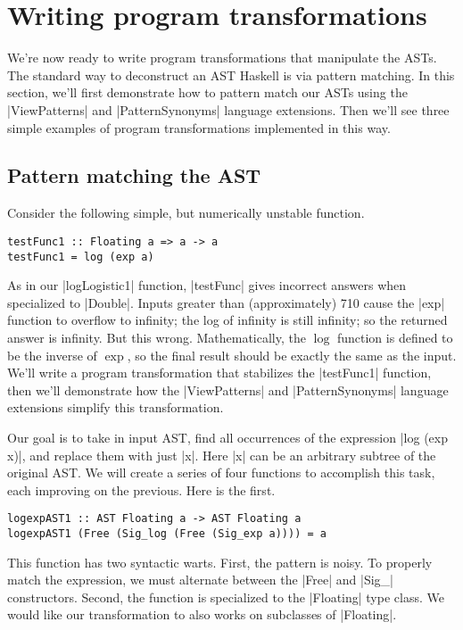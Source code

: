 \documentclass[preprint]{sigplanconf}
\theoremstyle{definition}
\begin{document}

\section{Writing program transformations}
\label{sec:stabilize}

We're now ready to write program transformations that manipulate the ASTs.
The standard way to deconstruct an AST Haskell is via pattern matching.
In this section, we'll first demonstrate how to pattern match our ASTs using the |ViewPatterns| and |PatternSynonyms| language extensions.
Then we'll see three simple examples of program transformations implemented in this way.


\subsection{Pattern matching the AST}

Consider the following simple,
but numerically unstable function.
\begin{lstlisting}
testFunc1 :: Floating a => a -> a
testFunc1 = log (exp a)
\end{lstlisting}
As in our |logLogistic1| function, |testFunc| gives incorrect answers when specialized to |Double|.
Inputs greater than (approximately) 710 cause the |exp| function to overflow to infinity;
the log of infinity is still infinity;
so the returned answer is infinity.
But this wrong.
Mathematically, the $\log$ function is defined to be the inverse of $\exp$,
so the final result should be exactly the same as the input.
We'll write a program transformation that stabilizes the |testFunc1| function,
then we'll demonstrate how the |ViewPatterns| and |PatternSynonyms| language extensions simplify this transformation.
\label{sec:viewpatterns}

Our goal is to take in input AST,
find all occurrences of the expression |log (exp x)|,
and replace them with just |x|.
Here |x| can be an arbitrary subtree of the original AST.
We will create a series of four functions to accomplish this task,
each improving on the previous.
Here is the first.
\begin{lstlisting}
logexpAST1 :: AST Floating a -> AST Floating a
logexpAST1 (Free (Sig_log (Free (Sig_exp a)))) = a
\end{lstlisting}
This function has two syntactic warts.
First, the pattern is noisy.
To properly match the expression, we must alternate between the |Free| and |Sig_| constructors.
Second, the function is specialized to the |Floating| type class.
We would like our transformation to also works on subclasses of |Floating|.
\end{document}
